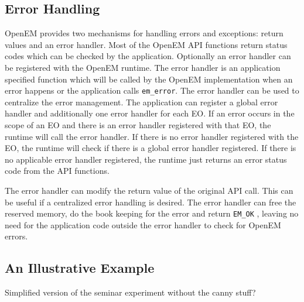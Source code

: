\subsection{Error Handling}
\label{subsec:error}
OpenEM provides two mechanisms for handling errors and exceptions: return values and an error handler. Most of the OpenEM API functions return status codes which can be checked by the application. \cite{openempage} Optionally an error handler can be registered with the OpenEM runtime. The error handler is an application specified function which will be called by the OpenEM implementation when an error happens or the application calls \texttt{em\_error}. The error handler can be used to centralize the error management. The application can register a global error handler and additionally one error handler for each EO. If an error occurs in the scope of an EO and there is an error handler registered with that EO, the runtime will call the error handler. If there is no error handler registered with the EO, the runtime will check if there is a global error handler registered. If there is no applicable error handler registered, the runtime just returns an error status code from the API functions. \cite{openempage}

The error handler can modify the return value of the original API call. This can be useful if a centralized error handling is desired. The error handler can free the reserved memory, do the book keeping for the error and return \texttt{EM\_OK} , leaving no need for the application code outside the error handler to check for OpenEM errors. \cite{openempage}

\subsection{An Illustrative Example}
\label{subsec:example}
Simplified version of the seminar experiment without the canny stuff?

